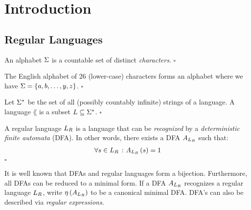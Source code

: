 \section{Introduction}

\subsection{Regular Languages}

\begin{definition}[Alphabet]
  An alphabet \(\Sigma\) is a countable set of distinct
  \textit{characters}.
  \hfill\(\square\)
\end{definition}

\begin{example}
  The English alphabet of 26 (lower-case) characters forms an alphabet
  where we have
  \(\Sigma = \left\{a, b, \ldots, y, z\right\}\).
  \hfill\(\square\)
\end{example}

\begin{definition}[Language]
  Let \(\Sigma^\ast\) be the set of all (possibly countably infinite)
  strings of a language.
  A language \(\lang\) is a subset \(L \subseteq \Sigma^\ast\).
  \hfill\(\square\)
\end{definition}

\begin{definition}
  A regular language \(L_{R}\) is a language that can be
  \textit{recognized} by a \textit{deterministic finite automata} (DFA).
  In other words, there exists a DFA \(A_{L_{R}}\) such that:
  \begin{align*}
    \forall s \in L_{R} \ \colon A_{L_{R}}\left(s\right) = 1
  \end{align*}
  \hfill\(\square\)
\end{definition}

It is well known that DFAs and regular languages form a bijection.
Furthermore, all DFAs can be reduced to a minimal form.
If a DFA \(A_{L_{R}}\) recognizes a regular language \(L_{R}\),
write \(\eta\left(A_{L_{R}}\right)\) to be a canonical minimal DFA.
DFA's can also be described via \textit{regular expressions}.

